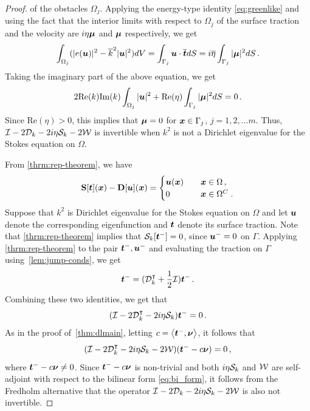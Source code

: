 \begin{proof}
of the obstacles $\Omega_{j}$.
Applying the energy-type identity \cref{eq:greenlike}
and using the fact that 
the interior limits with respect to $\Omega_{j}$
of the surface traction and the velocity
are $i\eta {\boldsymbol \mu}$ and ${\boldsymbol \mu}$ respectively, we get
\begin{equation}
\int_{\Omega_{j}} (|e({\boldsymbol u})|^{2} - \overline{k}^{2} |{\boldsymbol u}|^2) dV 
= \int_{\Gamma_{j}} {\boldsymbol u} \cdot \overline{{\boldsymbol t}} dS = 
i\overline{\eta}\int_{\Gamma_{j}} |{\boldsymbol \mu}|^2 dS \, .
\end{equation}
Taking the imaginary part of the above equation,
we get
\begin{equation}
2 \text{Re}(k) \text{Im}(k) \int_{\Omega_{j}} |{\boldsymbol u}|^2 + \text{Re}(\eta)
\int_{\Gamma_{j}} |{\boldsymbol \mu}|^2 dS = 0 \, .
\end{equation}
Since $\text{Re}(\eta)>0$, this implies that
${\boldsymbol \mu}=0$ for ${\boldsymbol x} \in \Gamma_{j}$, $j=1,2,\ldots m$. 
Thus, $\mathcal I - 2{\mathcal D}_{k} -2i\eta{\mathcal S}_{k} -2{\mathcal W}$ is
invertible when $k^2$ is not a Dirichlet eigenvalue
for the Stokes equation on $\Omega$.

From \cref{thrm:rep-theorem}, we have 
\begin{equation} \label{eq:rep-theorem}
  {\bf S} [{\boldsymbol t}]({\boldsymbol x}) - {\bf D}[{\boldsymbol u}]({\boldsymbol x}) = \begin{cases} 
    {\boldsymbol u}({\boldsymbol x}) &\quad {\boldsymbol x} \in \Omega \, , \\
    0 &\quad {\boldsymbol x} \in \Omega^{C} \; .
    \end{cases}
  \end{equation}
Suppose that $k^2$ is Dirichlet eigenvalue for
the Stokes equation on $\Omega$ and let ${\boldsymbol u}$
denote the corresponding eigenfunction and ${\boldsymbol t}$ denote
its surface traction. Note that \cref{thrm:rep-theorem}
implies that ${\mathcal S}_{k}[{\boldsymbol t}^{-}] = 0$, since
${\boldsymbol u}^{-}=0$ on $\Gamma$. Applying \cref{thrm:rep-theorem}
to the pair ${\boldsymbol t}^{-}, {\boldsymbol u}^{-}$ and evaluating the
traction on $\Gamma$ using~\cref{lem:jump-conds},
we get
\begin{equation}
{\boldsymbol t}^{-} = ({\mathcal D}^{\intercal}_{k} + \frac{1}{2} \mathcal I) {\boldsymbol t}^{-} \, . 
\end{equation}
Combining these two identities, we get
that
\begin{equation}
(\mathcal I - 2{\mathcal D}_{k}^{\intercal} -2i\eta {\mathcal S}_{k}) {\boldsymbol t}^{-} = 0 \, .
\end{equation}
As in the proof of~\cref{thm:dlmain}, letting
$c = \left< {\boldsymbol t}^{-} ,{\boldsymbol \nu} \right>$, it follows that
\begin{equation}
  (\mathcal I - 2{\mathcal D}_{k}^{\intercal} - 2i \eta {\mathcal S}_{k} - 2{\mathcal W})
  ({\boldsymbol t}^{-} - c{\boldsymbol \nu}) = 0 \, ,
\end{equation}
where ${\boldsymbol t}^{-} - c{\boldsymbol \nu} \neq 0$.
Since ${\boldsymbol t}^{-} - c{\boldsymbol \nu}$ is non-trivial and both
$i\eta {\mathcal S}_{k}$ and ${\mathcal W}$ are self-adjoint with respect
to the bilinear form \cref{eq:bi_form},
it follows from the Fredholm alternative
that the operator $\mathcal I - 2{\mathcal D}_{k} -2i\eta {\mathcal S}_k - 2{\mathcal W}$
is also not invertible.
\end{proof}

